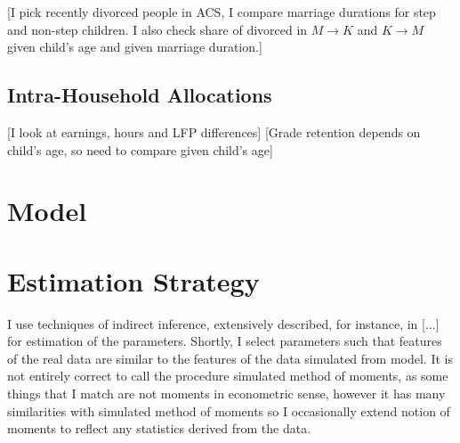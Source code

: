 \documentclass[12pt,letter]{article}
\begin{document}
[I pick recently divorced people in ACS, I compare marriage durations for step and non-step children. I also check share of divorced in $M\to K$ and $K\to M$ given child's age and given marriage duration.]


\subsection{Intra-Household Allocations}

[I look at earnings, hours and LFP differences] [Grade retention depends on child's age, so need to compare given child's age]
\section{Model}



\section{Estimation Strategy}
I use techniques of indirect inference, extensively described, for instance, in [...] for estimation of the parameters. Shortly, I select parameters such that features of the real data are similar to the features of the data simulated from model. It is not entirely correct to call the procedure simulated method of moments, as some things that I match are not moments in econometric sense, however it has many similarities with simulated method of moments so I occasionally extend notion of moments to reflect any statistics derived from the data.
\end{document}
